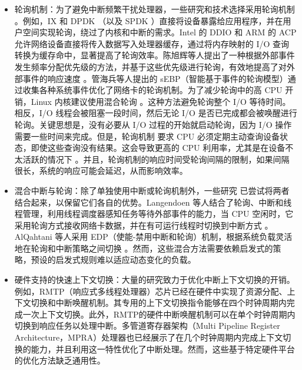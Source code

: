 \begin{itemize}
    \item 轮询机制：为了避免中断频繁干扰处理器，一些研究和技术选择采用轮询机制 \cite{Caulfield2010, Yang2012, Dejan2014, lwn2024}。例如，IX \cite{AdamIX2014} 和 DPDK \cite{DPDK}（以及 SPDK \cite{SPDK}）直接将设备暴露给应用程序，并在用户空间实现轮询，绕过了内核和中断的需求。Intel 的 DDIO \cite{DDIO} 和 ARM 的 ACP \cite{nayak_comparison_2018} 允许网络设备直接将传入数据写入处理器缓存，通过将内存映射的 I/O 查询转换为缓存命中，显著提高了轮询效率。陈旭辉等人提出了一种根据外部事件发生频率分配优先级的方法，并基于这些优先级进行轮询，有效地提高了对外部事件的响应速度 \cite{Chen2010}。管海兵等人提出的 sEBP（智能基于事件的轮询模型）通过收集各种系统事件优化了网络卡的轮询机制\cite{Guan2013}。为了减少轮询中的高 CPU 开销，Linux 内核建议使用混合轮询 \cite{le2017latency, Stephen2017}。这种方法避免轮询整个 I/O 等待时间。相反，I/O 线程会被阻塞一段时间，然后无论 I/O 是否已完成都会被唤醒进行轮询。关键思想是，没有必要从 I/O 过程的开始就启动轮询，因为 I/O 操作需要一些时间来完成。但是，轮询机制 要求 CPU 必须定期主动查询设备状态，即使这些查询没有结果。这会导致更高的 CPU 利用率，尤其是在设备不太活跃的情况下 \cite{Chen2010,AlQahtani2007, Gao1996, Lee2022}。并且，轮询机制的响应时间受轮询间隔的限制，如果间隔很长，系统的响应可能会延迟，从而影响效率。
    
    \item 混合中断与轮询：除了单独使用中断或轮询机制外，一些研究 \cite{Langendoen1996, AlQahtani2007} 已尝试将两者结合起来，以保留它们各自的优势。Langendoen 等人结合了轮询、中断和线程管理，利用线程调度器感知任务等待外部事件的能力，当 CPU 空闲时，它采用轮询方式接收网络卡数据，并在有可运行线程时切换到中断方式 \cite{Langendoen1996}。AlQahtani 等人采用 EDP（使能-禁用中断和轮询）机制，根据系统负载灵活地在轮询和中断策略之间切换 \cite{AlQahtani2007}。然而，这些混合方法需要依赖启发式的策略，预设的启发式规则难以适应动态变化的负载。
    
    \item 硬件支持的快速上下文切换：大量的研究致力于优化中断上下文切换的开销\cite{Yamasaki2006, Suito2012, Wada2019, Lopez2022}。例如，RMTP（响应式多线程处理器）芯片已经在硬件中实现了资源分配、上下文切换和中断唤醒机制。其专用的上下文切换指令能够在四个时钟周期内完成一次上下文切换。此外，RMTP的硬件中断唤醒机制可以在单个时钟周期内切换到响应任务以处理中断\cite{Dodiu2012}。多管道寄存器架构（Multi Pipeline Register Architecture，MPRA）处理器也已经展示了在几个时钟周期内完成上下文切换的能力，并且利用这一特性优化了中断处理\cite{Gaitan2014,ZAGAN2017}。然而，这些基于特定硬件平台的优化方法缺乏通用性。
    

\end{itemize}
